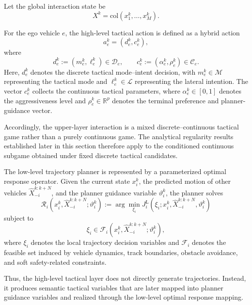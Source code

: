 \documentclass[final ,3p, times]{elsarticle}
\begin{document}
Let the global interaction state be
\begin{equation}
X^k = \mathrm{col}(x_1^k,\dots,x_M^k).
\label{eq:global_state}
\end{equation}

For the ego vehicle $e$, the high-level tactical action is defined as a hybrid action
\begin{equation}
a_e^k = \left(d_e^k,c_e^k\right),
\label{eq:tactical_action}
\end{equation}
where
\begin{equation}
d_e^k := \left(m_e^k,\ell_e^k\right)\in \mathcal{D}_e,
\qquad
c_e^k := \left(\alpha_e^k,\rho_e^k\right)\in \mathcal{C}_e.
\label{eq:tactical_action_components}
\end{equation}
Here, $d_e^k$ denotes the discrete tactical mode--intent decision, with $m_e^k \in \mathcal{M}$ representing the tactical mode and $\ell_e^k \in \mathcal{L}$ representing the lateral intention. The vector $c_e^k$ collects the continuous tactical parameters, where $\alpha_e^k \in [0,1]$ denotes the aggressiveness level and $\rho_e^k \in \mathbb{R}^p$ denotes the terminal preference and planner-guidance vector.

Accordingly, the upper-layer interaction is a mixed discrete--continuous tactical game rather than a purely continuous game. The analytical regularity results established later in this section therefore apply to the conditioned continuous subgame obtained under fixed discrete tactical candidates.


The low-level trajectory planner is represented by a parameterized optimal response operator. Given the current state $x_i^k$, the predicted motion of other vehicles $\hat X_{-i}^{k:k+N}$, and the planner guidance variable $\vartheta_i^k$, the planner solves
\begin{equation}
\mathcal{R}_i(x_i^k,\hat X_{-i}^{k:k+N};\vartheta_i^k)
:=
\arg\min_{\xi_i}
J_i^{\mathrm{L}}(\xi_i; x_i^k,\hat X_{-i}^{k:k+N},\vartheta_i^k)
\label{eq:lower_response}
\end{equation}
subject to
\begin{equation}
\xi_i \in \mathcal{F}_i(x_i^k,\hat X_{-i}^{k:k+N};\vartheta_i^k),
\label{eq:lower_feasible_set}
\end{equation}
where $\xi_i$ denotes the local trajectory decision variables and $\mathcal{F}_i$ denotes the feasible set induced by vehicle dynamics, track boundaries, obstacle avoidance, and soft safety-related constraints.

Thus, the high-level tactical layer does not directly generate trajectories. Instead, it produces semantic tactical variables that are later mapped into planner guidance variables and realized through the low-level optimal response mapping.
\end{document}
